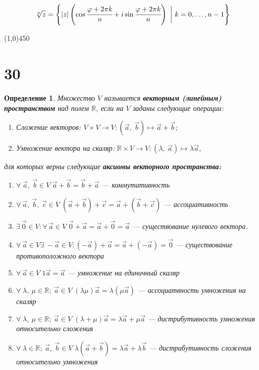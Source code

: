 \documentclass[a4paper,12pt]{article}
\newtheorem*{definition}{Определение}
\begin{document}
	\[ \sqrt[n]{z} = \Biggl\{|z|\left(\cos\cfrac{\varphi+2\pi k}{n}+i\sin\cfrac{\varphi+2\pi k }{n}\right)\ \biggl|\ k=0,\ldots,n-1\Biggr\}
	\]
	\begin{center}
		\line(1,0){450}
	\end{center}
	\section*{30}
	\begin{definition}
		Множество $V$ называется \textbf{векторным (линейным) пространством} над полем $\mathbb{R}$, если на $V$ заданы следующие операции:
		
		\begin{enumerate}
			\item Сложение векторов: $V \times V \rightarrow V : (\vec{a},\ \vec{b}) \mapsto \vec{a}+\vec{b}$;
			\item Умножение вектора на скаляр: $\mathbb{R} \times V \rightarrow V : (\lambda ,\ \vec{a}) \mapsto \lambda\vec{a}$,
		\end{enumerate}
		для которых верны следующие \textbf{аксиомы векторного пространства:}
		\begin{enumerate}
			\item $\forall\ \vec{a},\ \vec{b} \in V\; \vec{a} + \vec{b} = \vec{b} + \vec{a}$ --- коммутативность
			\item $\forall\,\vec{a},\ \vec{b},\ \vec{c} \in V\; (\vec{a} + \vec{b}) + \vec{c} = \vec{a} + (\vec{b} + \vec{c})$ --- ассоциативность
			\item $\exists\,\vec{0} \in V : \forall\,\vec{a} \in V\; \vec{0} + \vec{a} = \vec{a} + \vec{0} = \vec{a}$ --- существование нулевого вектора.
			\item $\forall\,\vec{a} \in V \exists\ -\vec{a} \in V : (-\vec{a}) + \vec{a} = \vec{a} + (-\vec{a}) = \vec{0}$ --- существование противоположного вектора
			\item $\forall\,\vec{a} \in V\; 1\vec{a} = \vec{a}$ --- умножение на единичный скаляр
			\item $\forall\ \lambda,\ \mu \in \mathbb{R};\ \vec{a} \in V\; (\lambda\mu)\vec{a} = \lambda(\mu\vec{a})$ --- ассоциатвность умножения на скаляр
			\item $\forall\ \lambda,\ \mu \in \mathbb{R};\ \vec{a} \in V\; (\lambda + \mu)\vec{a} = \lambda\vec{a} + \mu\vec{a}$ --- дистрибутивность умножения относительно сложения
			\item $\forall\ \lambda \in \mathbb{R};\ \vec{a},\ \vec{b} \in V\; \lambda(\vec{a} + \vec{b}) = \lambda \vec{a} + \lambda \vec{b}$ --- дистрибутивность сложения относительно умножения
		\end{enumerate}
	\end{definition}
\end{document}
